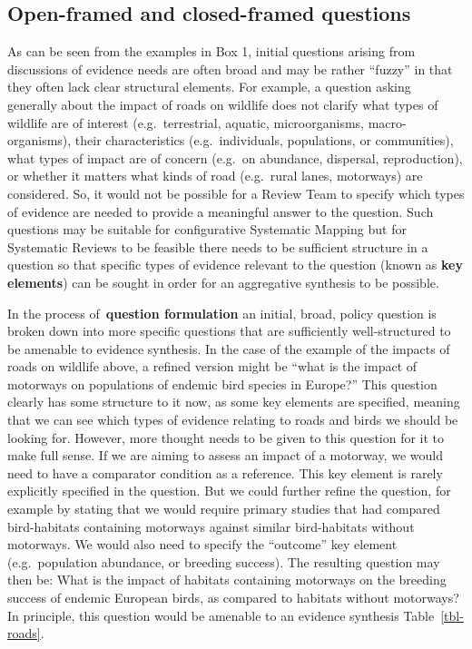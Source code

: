\documentclass[
  letterpaper,
  DIV=11,
  numbers=noendperiod]{scrreprt}
\begin{document}
\subsection{\texorpdfstring{\textbf{Open-framed and closed-framed
questions}}{Open-framed and closed-framed questions}}\label{sec-open}

As can be seen from the examples in Box 1, initial questions arising
from discussions of evidence needs are often broad and may be rather
``fuzzy'' in that they often lack clear structural elements. For
example, a question asking generally about the impact of roads on
wildlife does not clarify what types of wildlife are of interest
(e.g.~terrestrial, aquatic, microorganisms, macro-organisms), their
characteristics (e.g.~individuals, populations, or communities), what
types of impact are of concern (e.g.~on abundance, dispersal,
reproduction), or whether it matters what kinds of road (e.g.~rural
lanes, motorways) are considered. So, it would not be possible for a
Review Team to specify which types of evidence are needed to provide a
meaningful answer to the question. Such questions may be suitable for
configurative Systematic Mapping but for Systematic Reviews to be
feasible there needs to be sufficient structure in a question so that
specific types of evidence relevant to the question (known as
\textbf{key elements}) can be sought in order for an aggregative
synthesis to be possible.

In the process of~\textbf{question formulation} an initial, broad,
policy question is broken down into more specific questions that are
sufficiently well-structured to be amenable to evidence synthesis. In
the case of the example of the impacts of roads on wildlife above, a
refined version might be ``what is the impact of motorways on
populations of endemic bird species in Europe?'' This question clearly
has some structure to it now, as some key elements are specified,
meaning that we can see which types of evidence relating to roads and
birds we should be looking for. However, more thought needs to be given
to this question for it to make full sense. If we are aiming to assess
an impact of a motorway, we would need to have a comparator condition as
a reference. This key element is rarely explicitly specified in the
question. But we could further refine the question, for example by
stating that we would require primary studies that had compared
bird-habitats containing motorways against similar bird-habitats without
motorways. We would also need to specify the ``outcome'' key element
(e.g.~population abundance, or breeding success). The resulting question
may then be: What is the impact of habitats containing motorways on the
breeding success of endemic European birds, as compared to habitats
without motorways? In principle, this question would be amenable to an
evidence synthesis Table~\ref{tbl-roads}.
\end{document}
